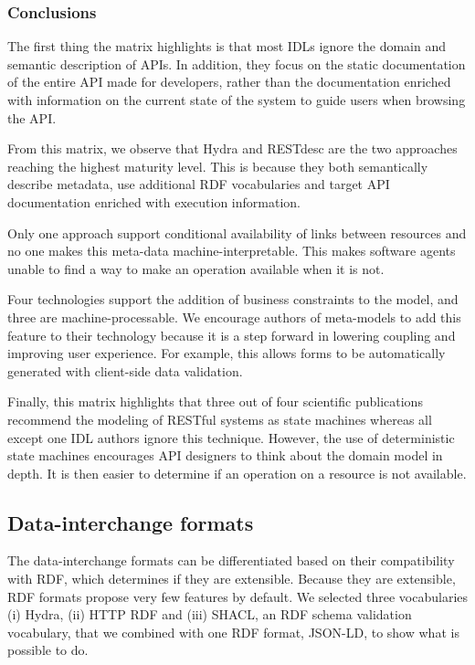 \subsubsection{Conclusions}

The first thing the matrix highlights is that most IDLs ignore the domain and semantic description of APIs. In addition, they focus on the static documentation of the entire API made for developers, rather than the documentation enriched with information on the current state of the system to guide users when browsing the API.

From this matrix, we observe that Hydra and RESTdesc are the two approaches reaching the highest maturity level. This is because they both semantically describe metadata, use additional RDF vocabularies and target API documentation enriched with execution information.

Only one approach \cite{Schreier:2011:MRA:1967428.1967434} support conditional availability of links between resources and no one makes this meta-data machine-interpretable. This makes software agents unable to find a way to make an operation available when it is not.

Four technologies support the addition of business constraints to the model, and three are machine-processable. We encourage authors of meta-models to add this feature to their technology because it is a step forward in lowering coupling and improving user experience. For example, this allows forms to be automatically generated with client-side data validation.

Finally, this matrix highlights that three out of four scientific publications recommend the modeling of RESTful systems as state machines whereas all except one IDL authors ignore this technique. However, the use of deterministic state machines encourages API designers to think about the domain model in depth. It is then easier to determine if an operation on a resource is not available.

\subsection{Data-interchange formats}

The data-interchange formats can be differentiated based on their compatibility with RDF, which determines if they are extensible. Because they are extensible, RDF formats propose very few features by default. We selected three vocabularies (i) Hydra, (ii) HTTP RDF and (iii) SHACL, an RDF schema validation vocabulary, that we combined with one RDF format, JSON-LD, to show what is possible to do.

